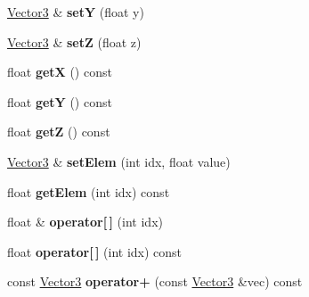 \begin{DoxyCompactItemize}
\hyperlink{classVectormath_1_1Aos_1_1Vector3}{Vector3} \& {\bfseries setY} (float y)
\item 
\mbox{\label{classVectormath_1_1Aos_1_1Vector3_abd50cace50e3b60599b6b65885966aec}} 
\hyperlink{classVectormath_1_1Aos_1_1Vector3}{Vector3} \& {\bfseries setZ} (float z)
\item 
\mbox{\label{classVectormath_1_1Aos_1_1Vector3_ad912f9b3f232b6106e5596d98d4f6fa3}} 
float {\bfseries getX} () const
\item 
\mbox{\label{classVectormath_1_1Aos_1_1Vector3_ace755b6ddb0f67120ca069fe129b7e07}} 
float {\bfseries getY} () const
\item 
\mbox{\label{classVectormath_1_1Aos_1_1Vector3_aeeae7db699654f849bc081dd43cbf1ff}} 
float {\bfseries getZ} () const
\item 
\mbox{\label{classVectormath_1_1Aos_1_1Vector3_a3a12a09dfe88f348f72ddc91fbb7bbc4}} 
\hyperlink{classVectormath_1_1Aos_1_1Vector3}{Vector3} \& {\bfseries set\+Elem} (int idx, float value)
\item 
\mbox{\label{classVectormath_1_1Aos_1_1Vector3_a0a307516df3385074aa2e3477c5e8517}} 
float {\bfseries get\+Elem} (int idx) const
\item 
\mbox{\label{classVectormath_1_1Aos_1_1Vector3_ac7873beab7df5fc972c52b45f78cebaa}} 
float \& {\bfseries operator\mbox{[}$\,$\mbox{]}} (int idx)
\item 
\mbox{\label{classVectormath_1_1Aos_1_1Vector3_ac2e26c51238f72bf70fe16507d505f33}} 
float {\bfseries operator\mbox{[}$\,$\mbox{]}} (int idx) const
\item 
\mbox{\label{classVectormath_1_1Aos_1_1Vector3_a44ed2c65d0cc969f1e1d3ae23a07303c}} 
const \hyperlink{classVectormath_1_1Aos_1_1Vector3}{Vector3} {\bfseries operator+} (const \hyperlink{classVectormath_1_1Aos_1_1Vector3}{Vector3} \&vec) const

\end{DoxyCompactItemize}
